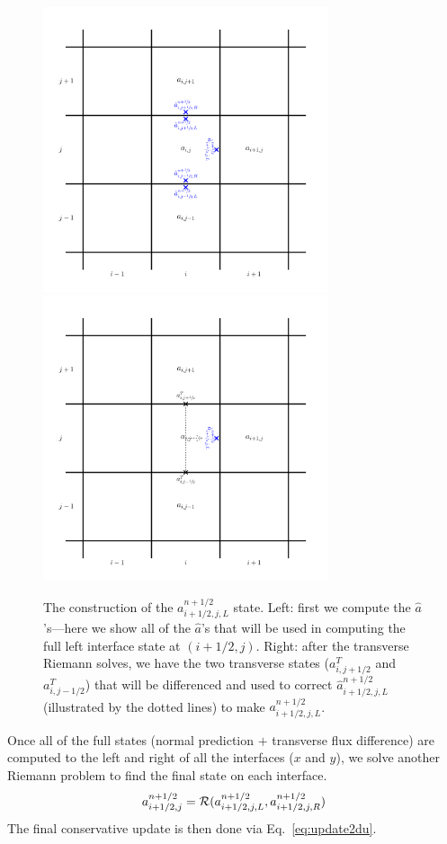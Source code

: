 \begin{figure}
\centering
\includegraphics[width=3.3in]{2dgrid-hat}
\includegraphics[width=3.3in]{2dgrid-transverse}
\caption[The construction of an interface state with the transverse
  component.]{\label{fig:unsplitstates} The construction of the
  $a_{i+1/2,j,L}^{n+1/2}$ state.  Left: first we compute the
  $\hat{a}$'s---here we show all of the $\hat{a}$'s that will be used
  in computing the full left interface state at $(i+1/2,j)$.  Right:
  after the transverse Riemann solves, we have the two transverse
  states ($a^T_{i,j+1/2}$ and $a^T_{i,j-1/2}$) that will be
  differenced and used to correct $\hat{a}_{i+1/2,j,L}^{n+1/2}$
  (illustrated by the dotted lines) to make $a_{i+1/2,j,L}^{n+1/2}$.}
\end{figure}

Once all of the full states (normal prediction $+$ transverse flux
difference) are computed to the left and right of all the interfaces
($x$ and $y$), we solve another Riemann problem to find the final 
state on each interface.
\begin{equation}
a_{i+1/2,j}^{n+1/2} = \mathcal{R}(a_{i+1/2,j,L}^{n+1/2},
                                  a_{i+1/2,j,R}^{n+1/2}) \\
\end{equation}
The final conservative update is then done via Eq.~\ref{eq:update2du}.

